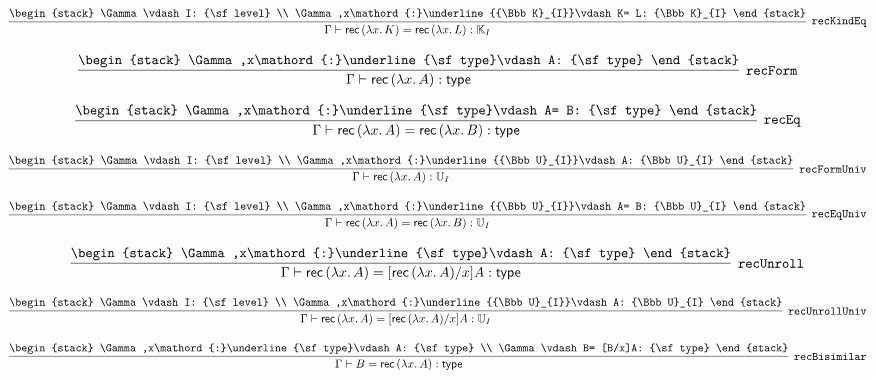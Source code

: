 \[
\infer[{\tt recKindEq}]{\Gamma \vdash {\sf rec}\,(\lambda x.\,K)= {\sf rec}\,(\lambda x.\,L): {\Bbb K}_{I}}{
\begin{stack}
\Gamma \vdash I: {\sf level}
\\
\Gamma ,x\mathord{:}\underline{{\Bbb K}_{I}}\vdash K= L: {\Bbb K}_{I}
\end{stack}}
\]

\[
\infer[{\tt recForm}]{\Gamma \vdash {\sf rec}\,(\lambda x.\,A): {\sf type}}{
\begin{stack}
\Gamma ,x\mathord{:}\underline{\sf type}\vdash A: {\sf type}
\end{stack}}
\]

\[
\infer[{\tt recEq}]{\Gamma \vdash {\sf rec}\,(\lambda x.\,A)= {\sf rec}\,(\lambda x.\,B): {\sf type}}{
\begin{stack}
\Gamma ,x\mathord{:}\underline{\sf type}\vdash A= B: {\sf type}
\end{stack}}
\]

\[
\infer[{\tt recFormUniv}]{\Gamma \vdash {\sf rec}\,(\lambda x.\,A): {\Bbb U}_{I}}{
\begin{stack}
\Gamma \vdash I: {\sf level}
\\
\Gamma ,x\mathord{:}\underline{{\Bbb U}_{I}}\vdash A: {\Bbb U}_{I}
\end{stack}}
\]

\[
\infer[{\tt recEqUniv}]{\Gamma \vdash {\sf rec}\,(\lambda x.\,A)= {\sf rec}\,(\lambda x.\,B): {\Bbb U}_{I}}{
\begin{stack}
\Gamma \vdash I: {\sf level}
\\
\Gamma ,x\mathord{:}\underline{{\Bbb U}_{I}}\vdash A= B: {\Bbb U}_{I}
\end{stack}}
\]

\[
\infer[{\tt recUnroll}]{\Gamma \vdash {\sf rec}\,(\lambda x.\,A)= [{\sf rec}\,(\lambda x.\,A)/x]A: {\sf type}}{
\begin{stack}
\Gamma ,x\mathord{:}\underline{\sf type}\vdash A: {\sf type}
\end{stack}}
\]

\[
\infer[{\tt recUnrollUniv}]{\Gamma \vdash {\sf rec}\,(\lambda x.\,A)= [{\sf rec}\,(\lambda x.\,A)/x]A: {\Bbb U}_{I}}{
\begin{stack}
\Gamma \vdash I: {\sf level}
\\
\Gamma ,x\mathord{:}\underline{{\Bbb U}_{I}}\vdash A: {\Bbb U}_{I}
\end{stack}}
\]

\[
\infer[{\tt recBisimilar}]{\Gamma \vdash B= {\sf rec}\,(\lambda x.\,A): {\sf type}}{
\begin{stack}
\Gamma ,x\mathord{:}\underline{\sf type}\vdash A: {\sf type}
\\
\Gamma \vdash B= [B/x]A: {\sf type}
\end{stack}}
\]

